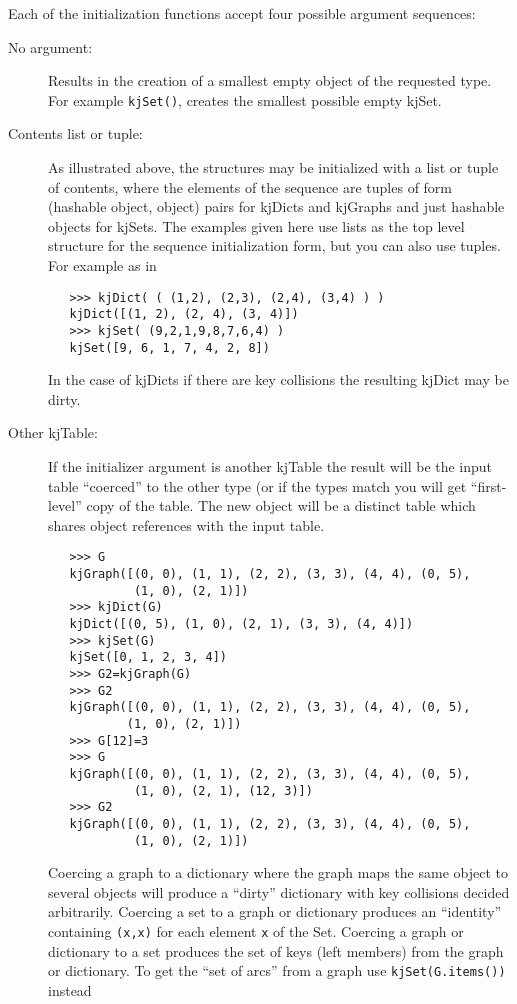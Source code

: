 Each of the initialization functions accept four possible argument
sequences:
\begin{description}
\item[No argument:]
Results in the creation of a smallest empty object of the requested
type.
For example {\tt kjSet()}, creates the smallest possible empty kjSet.
\item[Contents list or tuple:]
As illustrated above, the structures may be initialized with
a list or tuple of contents, where the elements of the sequence are
tuples of form
(hashable object, object) pairs for kjDicts and kjGraphs and
just hashable objects for kjSets.  The examples given here use lists
as the top level structure for the sequence initialization form,
but you can also use tuples.  For example as in
\begin{verbatim}
   >>> kjDict( ( (1,2), (2,3), (2,4), (3,4) ) )
   kjDict([(1, 2), (2, 4), (3, 4)])
   >>> kjSet( (9,2,1,9,8,7,6,4) )
   kjSet([9, 6, 1, 7, 4, 2, 8])
\end{verbatim}
In the case of kjDicts if there are key collisions the
resulting kjDict may be dirty.
\item[Other kjTable:]
If the initializer argument is another kjTable the result will be the input
table ``coerced'' to the other type (or if the types match
you will get ``first-level'' copy of the table.  
The new object will be a distinct table which shares object
references with the input table.
\begin{verbatim}
   >>> G
   kjGraph([(0, 0), (1, 1), (2, 2), (3, 3), (4, 4), (0, 5), 
            (1, 0), (2, 1)])
   >>> kjDict(G)
   kjDict([(0, 5), (1, 0), (2, 1), (3, 3), (4, 4)])
   >>> kjSet(G)
   kjSet([0, 1, 2, 3, 4])
   >>> G2=kjGraph(G)
   >>> G2
   kjGraph([(0, 0), (1, 1), (2, 2), (3, 3), (4, 4), (0, 5), 
           (1, 0), (2, 1)])
   >>> G[12]=3
   >>> G
   kjGraph([(0, 0), (1, 1), (2, 2), (3, 3), (4, 4), (0, 5), 
            (1, 0), (2, 1), (12, 3)])
   >>> G2
   kjGraph([(0, 0), (1, 1), (2, 2), (3, 3), (4, 4), (0, 5), 
            (1, 0), (2, 1)])
\end{verbatim}
Coercing
a graph to a dictionary where the graph maps the same object to several
objects will produce
a ``dirty'' dictionary with key collisions decided arbitrarily.
Coercing a set to a graph or dictionary produces an ``identity''
containing {\tt (x,x)} for each element {\tt x} of the Set.
Coercing a graph or dictionary to a set produces the set of
keys (left members) from the graph or dictionary.  To get the
``set of arcs'' from a graph use {\tt kjSet(G.items())} instead

\end{description}
